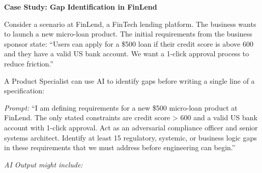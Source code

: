 \textbf{Case Study: Gap Identification in FinLend}

Consider a scenario at FinLend, a FinTech lending platform. The business
wants to launch a new micro-loan product. The initial requirements from
the business sponsor state: ``Users can apply for a \$500 loan if their
credit score is above 600 and they have a valid US bank account. We want
a 1-click approval process to reduce friction.''

A Product Specialist can use AI to identify gaps before writing a single
line of a specification:

\emph{Prompt:} ``I am defining requirements for a new \$500 micro-loan
product at FinLend. The only stated constraints are credit score
\textgreater{} 600 and a valid US bank account with 1-click approval.
Act as an adversarial compliance officer and senior systems architect.
Identify at least 15 regulatory, systemic, or business logic gaps in
these requirements that we must address before engineering can begin.''

\emph{AI Output might include:}


